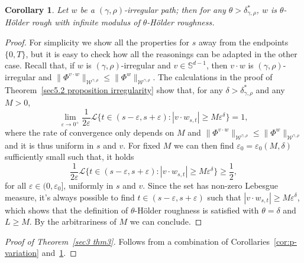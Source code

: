 \documentclass[10pt]{article}
\newcommand{\comma}{{,}}
\newcommand{\nobracket}{}
\newtheorem{corollary}[theorem]{Corollary}
\begin{document}
\begin{corollary}
  \label{cor:rho-holder-roughness}Let $w$ be a $(\gamma, \rho)$-irregular
  path; then for any $\theta > \delta^{\ast}_{\gamma, \rho}$, $w$ is
  $\theta$-H{\"o}lder rough with infinite modulus of $\theta$-H{\"o}lder
  roughness.
\end{corollary}

\begin{proof}
  For simplicity we show all the properties for $s$ away from the endpoints
  $\{ 0, T \}$, but it is easy to check how all the reasonings can be adapted
  in the other case. Recall that, if $w$ is $(\gamma, \rho)$\mbox{-}irregular
  and $v \in \mathbb{S}^{d - 1}$, then $v \cdot w$ is $(\gamma,
  \rho)$-irregular and $\| \Phi^{v \cdot w} \|_{\mathcal{W}^{\gamma \comma
  \rho}} \leqslant \| \Phi^w \|_{\mathcal{W}^{\gamma \comma \rho}}$. The
  calculations in the proof of Theorem~\ref{sec5.2 proposition irregularity}
  show that, for any $\delta > \delta^{\ast}_{\gamma, \rho}$ and any $M > 0$,
  \[ \lim_{\varepsilon \rightarrow 0^+} \frac{1}{2 \varepsilon} \mathcal{L} \{
     t \in (s - \varepsilon, s + \varepsilon) : | v \cdot \nobracket w_{s, t}
     | \nobracket \geqslant M \varepsilon^{\delta} \} = 1, \]
  where the rate of convergence only depends on $M$ and $\| \Phi^{v \cdot w}
  \|_{\mathcal{W}^{\gamma \comma \rho}} \leqslant \| \Phi^w
  \|_{\mathcal{W}^{\gamma \comma \rho}}$ and it is thus uniform in $s$ and
  $v$. For fixed $M$ we can then find $\varepsilon_0 = \varepsilon_0 (M,
  \delta)$ sufficiently small such that, it holds
  \[ \frac{1}{2 \varepsilon} \mathcal{L} \{ t \in (s - \varepsilon, s +
     \varepsilon) : | v \cdot w_{s, t} \nobracket | \nobracket \geqslant M
     \varepsilon^{\delta} \} \geqslant \frac{1}{2}, \]
  for all $\varepsilon \in (0, \varepsilon_0]$, uniformly in $s$ and $v$.
  Since the set has non-zero Lebesgue measure, it's always possible to find $t
  \in (s - \varepsilon, s + \varepsilon)$ such that $| v \cdot \nobracket
  w_{s, t} | \nobracket \geqslant M \varepsilon^{\delta}$, which shows that
  the definition of $\theta$\mbox{-}H\"{o}lder roughness is satisfied with
  $\theta = \delta$ and $L \geqslant M$. By the arbitrariness of $M$ we can
  conclude.
\end{proof}

\begin{proof}[Proof of Theorem~\ref{sec3 thm3}]
  Follows from a combination of Corollaries~\ref{cor:p-variation}
  and~\ref{cor:rho-holder-roughness}.
\end{proof}
\end{document}
